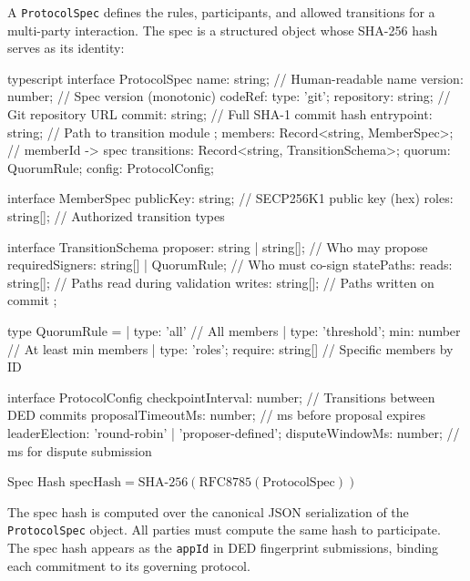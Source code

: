 \documentclass[11pt,a4paper]{article}
\begin{document}
A \texttt{ProtocolSpec} defines the rules, participants, and allowed
transitions for a multi-party interaction. The spec is a structured object
whose SHA-256 hash serves as its identity:

\begin{codebox}{typescript}
interface ProtocolSpec {
  name: string;                          // Human-readable name
  version: number;                       // Spec version (monotonic)
  codeRef: {
    type: 'git';
    repository: string;                  // Git repository URL
    commit: string;                      // Full SHA-1 commit hash
    entrypoint: string;                  // Path to transition module
  };
  members: Record<string, MemberSpec>;   // memberId -> spec
  transitions: Record<string, TransitionSchema>;
  quorum: QuorumRule;
  config: ProtocolConfig;
}

interface MemberSpec {
  publicKey: string;                     // SECP256K1 public key (hex)
  roles: string[];                       // Authorized transition types
}

interface TransitionSchema {
  proposer: string | string[];           // Who may propose
  requiredSigners: string[] | QuorumRule; // Who must co-sign
  statePaths: {
    reads: string[];                     // Paths read during validation
    writes: string[];                    // Paths written on commit
  };
}

type QuorumRule =
  | { type: 'all' }                      // All members
  | { type: 'threshold'; min: number }   // At least min members
  | { type: 'roles'; require: string[] } // Specific members by ID

interface ProtocolConfig {
  checkpointInterval: number;            // Transitions between DED commits
  proposalTimeoutMs: number;             // ms before proposal expires
  leaderElection: 'round-robin' | 'proposer-defined';
  disputeWindowMs: number;               // ms for dispute submission
}
\end{codebox}

\begin{defbox}{Spec Hash}
$\text{specHash} = \text{SHA-256}(\text{RFC8785}(\text{ProtocolSpec}))$

\medskip\noindent
The spec hash is computed over the canonical JSON serialization of the
\texttt{ProtocolSpec} object. All parties must compute the same hash to
participate. The spec hash appears as the \texttt{appId} in DED fingerprint
submissions, binding each commitment to its governing protocol.
\end{defbox}
\end{document}
